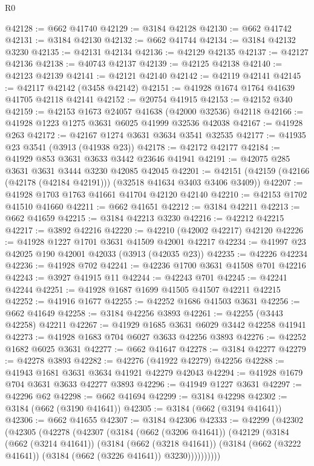 \begin{lexlean}{R0}
\begin{coremodule}
@42128 := @662 @41740
@42129 := @3184 @42128
@42130 := @662 @41742
@42131 := @3184 @42130
@42132 := @662 @41744
@42134 := @3184 @42132 @3230
@42135 := @42131 @42134
@42136 := @42129 @42135
@42137 := @42127 @42136
@42138 := @40743 @42137
@42139 := @42125 @42138
@42140 := @42123 @42139
@42141 := @42121 @42140
@42142 := @42119 @42141
@42145 := @42117 @42142 (@3458 @42142)
@42151 := @41928 @1674 @1764 @41639 @41705 @42118 @42141
@42152 := @20754 @41915
@42153 := @42152 @340
@42159 := @42153 @1673 @24057 @41638 (@42000 @32536) @42118
@42166 := @41928 @1223 @1275 @3631 @6025 @41999 @32536 @42038
@42167 := @41928 @263
@42172 := @42167 @1274 @3631 @3634 @3541 @32535
@42177 := @41935 @23 @3541 (@3913 (@41938 @23))
@42178 := @42172 @42177
@42184 := @41929 @853 @3631 @3633 @3442 @23646 @41941
@42191 := @42075 @285 @3631 @3631 @3444 @3230 @42085 @42045
@42201 := @42151 (@42159 (@42166 (@42178 (@42184 @42191))) (@32518 @41634 @3403 @3406 @3409))
@42207 := @41928 @1703 @1763 @41661 @41704 @42120 @42140
@42210 := @42153 @1702 @41510 @41660
@42211 := @662 @41651
@42212 := @3184 @42211
@42213 := @662 @41659
@42215 := @3184 @42213 @3230
@42216 := @42212 @42215
@42217 := @3892 @42216
@42220 := @42210 (@42002 @42217) @42120
@42226 := @41928 @1227 @1701 @3631 @41509 @42001 @42217
@42234 := @41997 @23 @42025 @190 @42001 @42033 (@3913 (@42035 @23))
@42235 := @42226 @42234
@42236 := @41928 @702
@42241 := @42236 @1700 @3631 @41508 @701 @42216
@42243 := @3927 @41915 @11
@42244 := @42243 @701
@42245 := @42241 @42244
@42251 := @41928 @1687 @1699 @41505 @41507 @42211 @42215
@42252 := @41916 @1677
@42255 := @42252 @1686 @41503 @3631
@42256 := @662 @41649
@42258 := @3184 @42256 @3893
@42261 := @42255 (@3443 @42258) @42211
@42267 := @41929 @1685 @3631 @6029 @3442 @42258 @41941
@42273 := @41928 @1683 @704 @6027 @3633 @42256 @3893
@42276 := @42252 @1682 @6025 @3631
@42277 := @662 @41647
@42278 := @3184 @42277
@42279 := @42278 @3893
@42282 := @42276 (@41922 @42279) @42256
@42288 := @41943 @1681 @3631 @3634 @41921 @42279 @42043
@42294 := @41928 @1679 @704 @3631 @3633 @42277 @3893
@42296 := @41949 @1227 @3631
@42297 := @42296 @62
@42298 := @662 @41694
@42299 := @3184 @42298
@42302 := @3184 (@662 (@3190 @41641))
@42305 := @3184 (@662 (@3194 @41641))
@42306 := @662 @41655
@42307 := @3184 @42306
@42333 := @42299
    (@42302
      (@42305
        (@42278
          (@42307
            (@3184
              (@662 (@3206 @41641))
              (@42129
                (@3184
                  (@662 (@3214 @41641))
                  (@3184
                    (@662 (@3218 @41641))
                    (@3184 (@662 (@3222 @41641)) (@3184 (@662 (@3226 @41641)) @3230))))))))))

\end{coremodule}
\end{lexlean}
